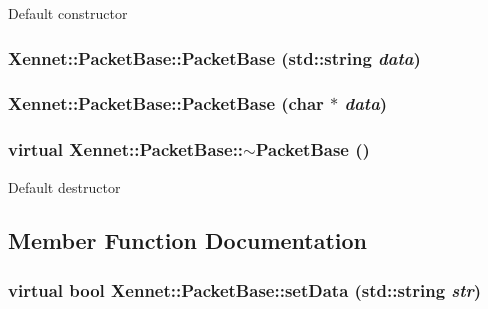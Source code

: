 Default constructor \hypertarget{classXennet_1_1PacketBase_2620be36e870d26091addfb1686687d1}{
\subsubsection{\setlength{\rightskip}{0pt plus 5cm}Xennet::PacketBase::PacketBase (std::string {\em data})}}
\label{classXennet_1_1PacketBase_2620be36e870d26091addfb1686687d1}


\hypertarget{classXennet_1_1PacketBase_7205e2e9af5f535c9395ce176dc6c0dd}{
\subsubsection{\setlength{\rightskip}{0pt plus 5cm}Xennet::PacketBase::PacketBase (char $\ast$ {\em data})}}
\label{classXennet_1_1PacketBase_7205e2e9af5f535c9395ce176dc6c0dd}


\hypertarget{classXennet_1_1PacketBase_d3fe1078f7de6c8c2b6fdb121bce870b}{
\subsubsection{\setlength{\rightskip}{0pt plus 5cm}virtual Xennet::PacketBase::$\sim$PacketBase ()}}
\label{classXennet_1_1PacketBase_d3fe1078f7de6c8c2b6fdb121bce870b}


Default destructor 

\subsection{Member Function Documentation}
\hypertarget{classXennet_1_1PacketBase_eb1c97c2b02b35899ab9ac23d034a619}{
\subsubsection{\setlength{\rightskip}{0pt plus 5cm}virtual bool Xennet::PacketBase::setData (std::string {\em str})}}
\label{classXennet_1_1PacketBase_eb1c97c2b02b35899ab9ac23d034a619}


